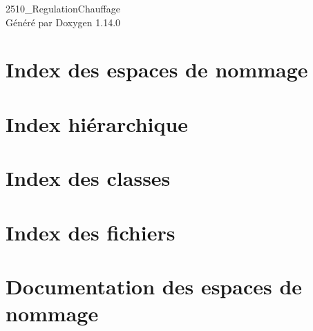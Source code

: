 \documentclass[twoside]{book}
\newcommand{\+}{\discretionary{\mbox{\scriptsize$\hookleftarrow$}}{}{}}
\newcommand{\clearemptydoublepage}{%
    \newpage{\pagestyle{empty}\cleardoublepage}%
  }
\begin{document}
  \raggedbottom
    \hypersetup{pageanchor=false,
                bookmarksnumbered=true,
                pdfencoding=unicode
               }
  \begin{titlepage}
  \vspace*{7cm}
  \begin{center}%
  {\Large 2510\+\_\+\+Regulation\+Chauffage}\\
  \vspace*{1cm}
  {\large Généré par Doxygen 1.14.0}\\
  \end{center}
  \end{titlepage}
  \clearemptydoublepage
  \tableofcontents
  \clearemptydoublepage
  \hypersetup{pageanchor=true}
\chapter{Index des espaces de nommage}

\chapter{Index hiérarchique}

\chapter{Index des classes}

\chapter{Index des fichiers}

\chapter{Documentation des espaces de nommage}





















\end{document}
